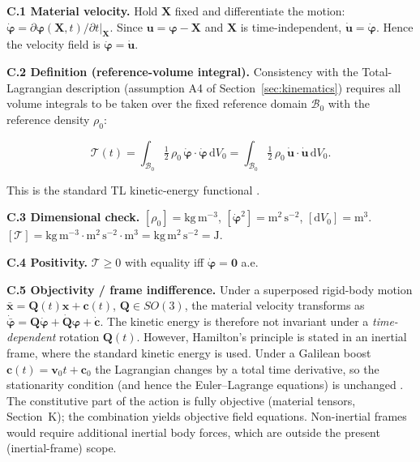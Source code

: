\documentclass[11pt]{article}
\begin{document}
\textbf{C.1 Material velocity.} Hold $\mathbf{X}$ fixed and differentiate the motion:
$\dot{\boldsymbol{\varphi}} = \partial\boldsymbol{\varphi}(\mathbf{X},t)/\partial t|_{\mathbf{X}}$.
Since $\mathbf{u}=\boldsymbol{\varphi}-\mathbf{X}$ and $\mathbf{X}$ is time-independent,
$\dot{\mathbf{u}} = \dot{\boldsymbol{\varphi}}$. Hence the velocity field is $\dot{\boldsymbol{\varphi}}=\dot{\mathbf{u}}$.

\textbf{C.2 Definition (reference-volume integral).} Consistency with the Total-Lagrangian description (assumption A4 of Section~\ref{sec:kinematics}) requires all volume integrals to be taken over the fixed reference domain $\mathcal{B}_{0}$ with the reference density $\rho_{0}$:

\begin{equation}
\mathcal{T}(t)
= \int_{\mathcal{B}_{0}}
  \tfrac12\,\rho_{0}\,\dot{\boldsymbol{\varphi}}\cdot\dot{\boldsymbol{\varphi}}\,
  \mathrm{d}V_{0}
= \int_{\mathcal{B}_{0}}
  \tfrac12\,\rho_{0}\,\dot{\mathbf{u}}\cdot\dot{\mathbf{u}}\,
  \mathrm{d}V_{0}.
\label{rn:T}
\end{equation}

This is the standard TL kinetic-energy functional \cite{BonetWood2008,Bathe2006,Holzapfel2000}.

\textbf{C.3 Dimensional check.}
$[\rho_{0}]=\mathrm{kg\,m^{-3}}$, $[\dot{\boldsymbol{\varphi}}^{2}]=\mathrm{m^{2}\,s^{-2}}$, $[\mathrm{d}V_{0}]=\mathrm{m^{3}}$.
$[\mathcal{T}]=\mathrm{kg\,m^{-3}}\cdot\mathrm{m^{2}\,s^{-2}}\cdot\mathrm{m^{3}}=\mathrm{kg\,m^{2}\,s^{-2}}=\mathrm{J}$. \checkmark

\textbf{C.4 Positivity.} $\mathcal{T}\ge 0$ with equality iff $\dot{\boldsymbol{\varphi}}=\mathbf{0}$ a.e. \checkmark

\textbf{C.5 Objectivity / frame indifference.} Under a superposed rigid-body motion $\bar{\mathbf{x}}=\mathbf{Q}(t)\mathbf{x}+\mathbf{c}(t)$, $\mathbf{Q}\in SO(3)$, the material velocity transforms as $\dot{\bar{\boldsymbol{\varphi}}}=\mathbf{Q}\dot{\boldsymbol{\varphi}}+\dot{\mathbf{Q}}\boldsymbol{\varphi}+\dot{\mathbf{c}}$. The kinetic energy is therefore not invariant under a \emph{time-dependent} rotation $\mathbf{Q}(t)$. However, Hamilton's principle is stated in an inertial frame, where the standard kinetic energy is used. Under a Galilean boost $\mathbf{c}(t)=\mathbf{v}_{0}t+\mathbf{c}_{0}$ the Lagrangian changes by a total time derivative, so the stationarity condition (and hence the Euler--Lagrange equations) is unchanged \cite{Goldstein2002,MarsdenHughes1983}. The constitutive part of the action is fully objective (material tensors, Section~K); the combination yields objective field equations. Non-inertial frames would require additional inertial body forces, which are outside the present (inertial-frame) scope.
\end{document}
